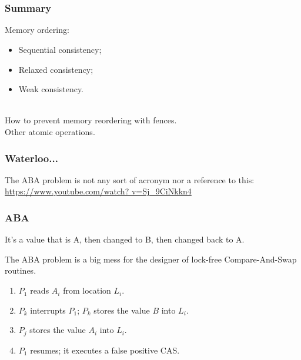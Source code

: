 \section{}
\begin{frame}
  \frametitle{Summary}
  
 Memory ordering:
      \begin{itemize}
        \item Sequential consistency;
        \item Relaxed consistency;
        \item Weak consistency.
      \end{itemize}~\\

 How to prevent memory reordering with fences.\\

 Other atomic operations.\\
  
\end{frame}



\begin{frame}
\frametitle{Waterloo...}

The ABA problem is not any sort of acronym nor a reference to this: \url{https://www.youtube.com/watch? v=Sj_9CiNkkn4}


\end{frame}



\begin{frame}
\frametitle{ABA}

It's a value that is A, then changed to B, then changed back to A. 

The ABA problem is a big mess for the designer of lock-free Compare-And-Swap routines. 

\begin{enumerate}
	\item $P_{1}$ reads $A_{i}$ from location $L_{i}$.
	\item $P_{k}$ interrupts $P_{1}$; $P_{k}$ stores the value $B$ into $L_{i}$.
	\item $P_{j}$ stores the value $A_{i}$ into $L_{i}$.
	\item $P_{1}$ resumes; it executes a false positive CAS.
\end{enumerate} 


\end{frame}



